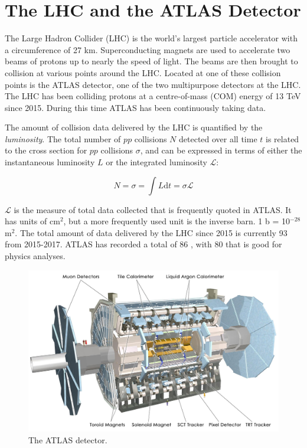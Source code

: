 \clearpage

\section{The LHC and the ATLAS Detector}

The Large Hadron Collider (LHC) is the world's largest particle accelerator with a circumference of 27 km. Superconducting magnets are used to accelerate two beams of protons up to nearly the speed of light. The beams are then brought to collision at various points around the LHC. Located at one of these collision points is the ATLAS detector, one of the two multipurpose detectors at the LHC. The LHC has been colliding protons at a centre-of-mass (COM) energy of 13 TeV since 2015. During this time ATLAS has been continuously taking data.

The amount of \pp collision data delivered by the LHC is quantified by the \textit{luminosity}. The total number of $pp$ collisions $N$ detected over all time $t$ is related to the cross section for $pp$ collisions $\sigma$, and can be expressed in terms of either the instantaneous luminosity $L$ or the integrated luminosity $\mathcal{L}$:

\begin{equation}
N = \sigma = \int{L} \text{d}t = \sigma \mathcal{L}
\end{equation}

\noindent $\mathcal{L}$ is the measure of total data collected that is frequently quoted in ATLAS. It has units of cm$^2$, but a more frequently used unit is the inverse barn. 1 b = 10$^{-28}$ m$^2$. The total amount of data delivered by the LHC since 2015 is currently 93 \ifb from 2015-2017. ATLAS has recorded a total of 86 \ifb, with 80 \ifb that is good for physics analyses.

\begin{figure}[htb]
\centering
\includegraphics[width=1\textwidth]{Figures/atlas.jpg}
\caption{The ATLAS detector.}
\label{fig:atlas}
\end{figure}

